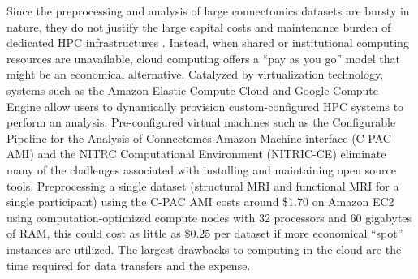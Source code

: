 \documentclass{bmcart}
\begin{document}
Since the preprocessing and analysis of large connectomics datasets are bursty in nature, they do not justify the large capital costs and maintenance burden of dedicated HPC infrastructures \cite{ODriscoll2013}. Instead, when shared or institutional computing resources are unavailable, cloud computing offers a ``pay as you go'' model that might be an economical alternative. Catalyzed by virtualization technology, systems such as the Amazon Elastic Compute Cloud and Google Compute Engine allow users to dynamically provision custom-configured HPC systems to perform an analysis. Pre-configured virtual machines such as the Configurable Pipeline for the Analysis of Connectomes Amazon Machine interface (C-PAC AMI) \cite{CPAC_AMI2014}  and the NITRC Computational Environment (NITRIC-CE) \cite{NITRC_CE2014} eliminate many of the challenges associated with installing and maintaining open source tools.  Preprocessing a single dataset (structural MRI and functional MRI for a single participant) using the C-PAC AMI costs around \$1.70 on Amazon EC2 using computation-optimized compute nodes with 32 processors and 60 gigabytes of RAM, this could cost as little as \$0.25 per dataset if more economical ``spot'' instances are utilized. The largest drawbacks to computing in the cloud are the time required for data transfers and the expense.
\end{document}
